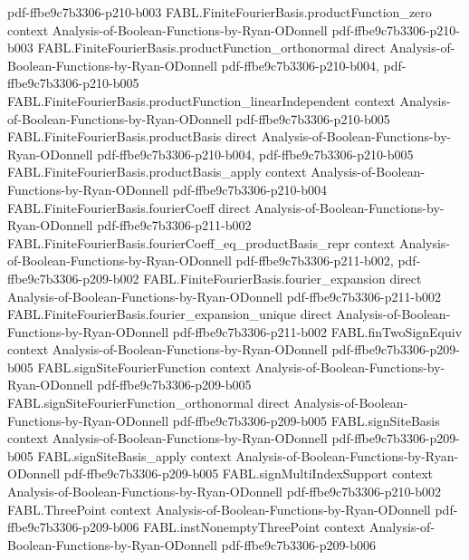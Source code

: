 \begin{theorem}
  {pdf-ffbe9c7b3306-p210-b003}
\proofstep
  {FABL.FiniteFourierBasis.productFunction_zero}
  {context}
  {Analysis-of-Boolean-Functions-by-Ryan-ODonnell}
  {pdf-ffbe9c7b3306-p210-b003}
\proofstep
  {FABL.FiniteFourierBasis.productFunction_orthonormal}
  {direct}
  {Analysis-of-Boolean-Functions-by-Ryan-ODonnell}
  {pdf-ffbe9c7b3306-p210-b004,
    pdf-ffbe9c7b3306-p210-b005}
\proofstep
  {FABL.FiniteFourierBasis.productFunction_linearIndependent}
  {context}
  {Analysis-of-Boolean-Functions-by-Ryan-ODonnell}
  {pdf-ffbe9c7b3306-p210-b005}
\proofstep
  {FABL.FiniteFourierBasis.productBasis}
  {direct}
  {Analysis-of-Boolean-Functions-by-Ryan-ODonnell}
  {pdf-ffbe9c7b3306-p210-b004,
    pdf-ffbe9c7b3306-p210-b005}
\proofstep
  {FABL.FiniteFourierBasis.productBasis_apply}
  {context}
  {Analysis-of-Boolean-Functions-by-Ryan-ODonnell}
  {pdf-ffbe9c7b3306-p210-b004}
\proofstep
  {FABL.FiniteFourierBasis.fourierCoeff}
  {direct}
  {Analysis-of-Boolean-Functions-by-Ryan-ODonnell}
  {pdf-ffbe9c7b3306-p211-b002}
\proofstep
  {FABL.FiniteFourierBasis.fourierCoeff_eq_productBasis_repr}
  {context}
  {Analysis-of-Boolean-Functions-by-Ryan-ODonnell}
  {pdf-ffbe9c7b3306-p211-b002,
    pdf-ffbe9c7b3306-p209-b002}
\proofstep
  {FABL.FiniteFourierBasis.fourier_expansion}
  {direct}
  {Analysis-of-Boolean-Functions-by-Ryan-ODonnell}
  {pdf-ffbe9c7b3306-p211-b002}
\proofstep
  {FABL.FiniteFourierBasis.fourier_expansion_unique}
  {direct}
  {Analysis-of-Boolean-Functions-by-Ryan-ODonnell}
  {pdf-ffbe9c7b3306-p211-b002}
\proofstep
  {FABL.finTwoSignEquiv}
  {context}
  {Analysis-of-Boolean-Functions-by-Ryan-ODonnell}
  {pdf-ffbe9c7b3306-p209-b005}
\proofstep
  {FABL.signSiteFourierFunction}
  {context}
  {Analysis-of-Boolean-Functions-by-Ryan-ODonnell}
  {pdf-ffbe9c7b3306-p209-b005}
\proofstep
  {FABL.signSiteFourierFunction_orthonormal}
  {direct}
  {Analysis-of-Boolean-Functions-by-Ryan-ODonnell}
  {pdf-ffbe9c7b3306-p209-b005}
\proofstep
  {FABL.signSiteBasis}
  {context}
  {Analysis-of-Boolean-Functions-by-Ryan-ODonnell}
  {pdf-ffbe9c7b3306-p209-b005}
\proofstep
  {FABL.signSiteBasis_apply}
  {context}
  {Analysis-of-Boolean-Functions-by-Ryan-ODonnell}
  {pdf-ffbe9c7b3306-p209-b005}
\proofstep
  {FABL.signMultiIndexSupport}
  {context}
  {Analysis-of-Boolean-Functions-by-Ryan-ODonnell}
  {pdf-ffbe9c7b3306-p210-b002}
\proofstep
  {FABL.ThreePoint}
  {context}
  {Analysis-of-Boolean-Functions-by-Ryan-ODonnell}
  {pdf-ffbe9c7b3306-p209-b006}
\proofstep
  {FABL.instNonemptyThreePoint}
  {context}
  {Analysis-of-Boolean-Functions-by-Ryan-ODonnell}
  {pdf-ffbe9c7b3306-p209-b006}

\end{theorem}
